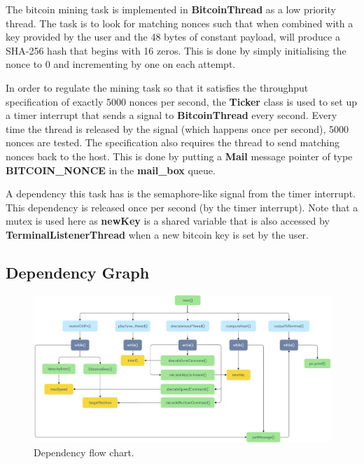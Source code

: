\documentclass{article}
\begin{document}
\noindent
The bitcoin mining task is implemented in \textbf{BitcoinThread} as a low priority thread. The task is to look for matching nonces such that when combined with a key provided by the user and the 48 bytes of constant payload, will produce a SHA-256 hash that begins with 16 zeros. This is done by simply initialising the nonce to 0 and incrementing by one on each attempt. 

\bigskip

\noindent
In order to regulate the mining task so that it satisfies the throughput specification of exactly 5000 nonces per second, the \textbf{Ticker} class is used to set up a timer interrupt that sends a signal to \textbf{BitcoinThread} every second. Every time the thread is released by the signal (which happens once per second), 5000 nonces are tested. The specification also requires the thread to send matching nonces back to the host. This is done by putting a \textbf{Mail} message pointer of type \textbf{BITCOIN\_NONCE} in the \textbf{mail\_box} queue. 

\bigskip



\bigskip

\noindent
A dependency this task has is the semaphore-like signal from the timer interrupt. This dependency is released once per second (by the timer interrupt). Note that a mutex is used here as \textbf{newKey} is a shared variable that is also accessed by \textbf{TerminalListenerThread} when a new bitcoin key is set by the user. 


\subsection{Dependency Graph}

\begin{figure}[H]
\begin{center}
   \includegraphics[width=0.9\linewidth]{dependency.png}
\end{center}
   \caption{Dependency flow chart.}
\label{fig:long}
\label{fig:onecol}
\end{figure}
\end{document}
